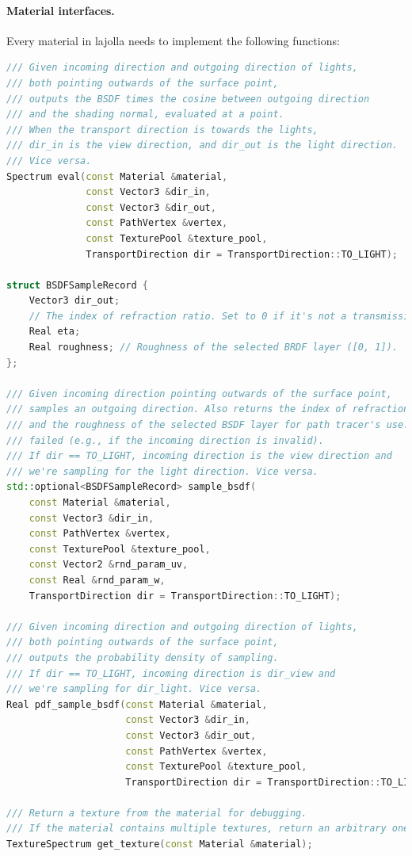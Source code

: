 \paragraph{Material interfaces.} Every material in lajolla needs to implement the following functions:
\begin{lstlisting}[language=c++]
/// Given incoming direction and outgoing direction of lights,
/// both pointing outwards of the surface point,
/// outputs the BSDF times the cosine between outgoing direction
/// and the shading normal, evaluated at a point.
/// When the transport direction is towards the lights,
/// dir_in is the view direction, and dir_out is the light direction.
/// Vice versa.
Spectrum eval(const Material &material,
              const Vector3 &dir_in,
              const Vector3 &dir_out,
              const PathVertex &vertex,
              const TexturePool &texture_pool,
              TransportDirection dir = TransportDirection::TO_LIGHT);

struct BSDFSampleRecord {
    Vector3 dir_out;
    // The index of refraction ratio. Set to 0 if it's not a transmission event.
    Real eta;
    Real roughness; // Roughness of the selected BRDF layer ([0, 1]).
};

/// Given incoming direction pointing outwards of the surface point,
/// samples an outgoing direction. Also returns the index of refraction
/// and the roughness of the selected BSDF layer for path tracer's use.
/// failed (e.g., if the incoming direction is invalid).
/// If dir == TO_LIGHT, incoming direction is the view direction and 
/// we're sampling for the light direction. Vice versa.
std::optional<BSDFSampleRecord> sample_bsdf(
    const Material &material,
    const Vector3 &dir_in,
    const PathVertex &vertex,
    const TexturePool &texture_pool,
    const Vector2 &rnd_param_uv,
    const Real &rnd_param_w,
    TransportDirection dir = TransportDirection::TO_LIGHT);

/// Given incoming direction and outgoing direction of lights,
/// both pointing outwards of the surface point,
/// outputs the probability density of sampling.
/// If dir == TO_LIGHT, incoming direction is dir_view and 
/// we're sampling for dir_light. Vice versa.
Real pdf_sample_bsdf(const Material &material,
                     const Vector3 &dir_in,
                     const Vector3 &dir_out,
                     const PathVertex &vertex,
                     const TexturePool &texture_pool,
                     TransportDirection dir = TransportDirection::TO_LIGHT);

/// Return a texture from the material for debugging.
/// If the material contains multiple textures, return an arbitrary one.
TextureSpectrum get_texture(const Material &material);
\end{lstlisting}

